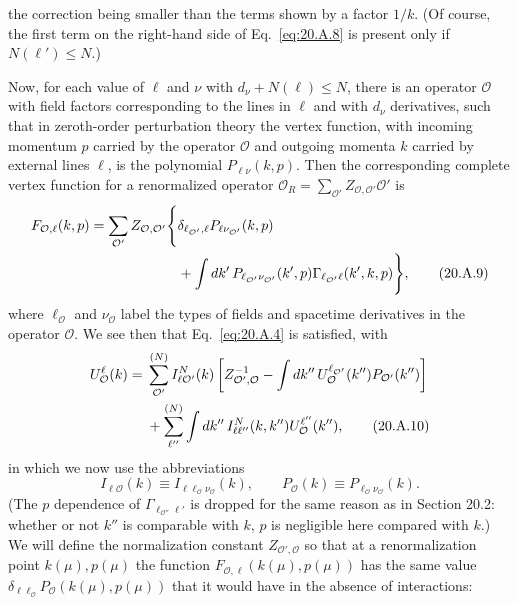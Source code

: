 \endgroup
the correction being smaller than the terms shown by a factor $1/k$. (Of course, the first term on the right-hand side of Eq.~\eqref{eq:20.A.8} is present only if $N(\ell')\leq N$.)

Now, for each value of $\ell$ and $\nu$ with $d_\nu+N(\ell)\leq N$, there is an operator $\mathcal O$ with field factors corresponding to the lines in $\ell$ and with $d_\nu$ derivatives, such that in zeroth-order perturbation theory the vertex function, with incoming momentum $p$ carried by the operator $\mathcal O$ and outgoing momenta $k$ carried by external lines $\ell$, is the polynomial $P_{\ell\nu}(k,p)$. Then the corresponding complete vertex function for a renormalized operator $\mathcal O_R=\sum_{\mathcal O'}Z_{\mathcal O,\mathcal O'}\mathcal O'$ is
\begin{align}
F_{\mathcal O,\ell}(k,p)
=\sum_{\mathcal O'}Z_{\mathcal O,\mathcal O'}
\Bigg\{&
\delta_{\ell_{\mathcal O'},\ell}
P_{\ell\nu_{\mathcal O'}}(k,p)
\notag\\
&+\int dk'\,
P_{\ell_{\mathcal O'}\nu_{\mathcal O'}}(k',p)
\Gamma_{\ell_{\mathcal O'}\ell}(k',k,p)
\Bigg\},
\tag{20.A.9}\label{eq:20.A.9}
\end{align}
where $\ell_{\mathcal O}$ and $\nu_{\mathcal O}$ label the types of fields and spacetime derivatives in the operator $\mathcal O$. We see then that Eq.~\eqref{eq:20.A.4} is satisfied, with
\begin{align}
U_{\mathcal O}^{\ell}(k)
={}&
\sum_{\mathcal O'}^{(N)}
I_{\ell\mathcal O'}^N(k)
\left[
Z_{\mathcal O',\mathcal O}^{-1}
-\int dk''\,
U_{\mathcal O}^{\ell_{\mathcal O'}}(k'')
P_{\mathcal O'}(k'')
\right]
\notag\\
&+\sum_{\ell''}^{(N)}
\int dk''\,
I_{\ell\ell''}^N(k,k'')
U_{\mathcal O}^{\ell''}(k''),
\tag{20.A.10}\label{eq:20.A.10}
\end{align}
in which we now use the abbreviations
\begin{equation}
I_{\ell\mathcal O}(k)
\equiv I_{\ell\ell_{\mathcal O}\nu_{\mathcal O}}(k),
\qquad
P_{\mathcal O}(k)
\equiv P_{\ell_{\mathcal O}\nu_{\mathcal O}}(k).
\tag{20.A.11}\label{eq:20.A.11}
\end{equation}
(The $p$ dependence of $\Gamma_{\ell_{\mathcal O''}\ell'}$ is dropped for the same reason as in Section 20.2: whether or not $k''$ is comparable with $k$, $p$ is negligible here compared with $k$.) We will define the normalization constant $Z_{\mathcal O',\mathcal O}$ so that at a renormalization point $k(\mu),p(\mu)$ the function $F_{\mathcal O,\ell}(k(\mu),p(\mu))$ has the same value $\delta_{\ell\ell_{\mathcal O}}P_{\mathcal O}(k(\mu),p(\mu))$ that it would have in the absence of interactions:
